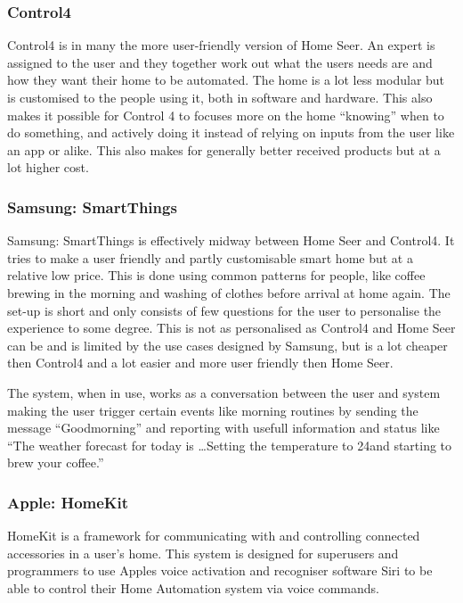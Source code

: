 \subsubsection{Control4}
Control4 is in many the more user-friendly version of Home Seer. An expert is assigned to the user and they together work out what the users needs are and how they want their home to be automated. The home is a lot less modular but is customised to the people using it, both in software and hardware. This also makes it possible for Control 4 to focuses more on the home \enquote{knowing} when to do something, and actively doing it instead of relying on inputs from the user like an app or alike. This also makes for generally better received products but at a lot higher cost.%

\subsubsection{Samsung: SmartThings}
Samsung: SmartThings is effectively midway between Home Seer and Control4. It tries to make a user friendly and partly customisable smart home but at a relative low price. This is done using common patterns for people, like coffee brewing in the morning and washing of clothes before arrival at home again. The set-up is short and only consists of few questions for the user to personalise the experience to some degree. This is not as personalised as Control4 and Home Seer can be and is limited by the use cases designed by Samsung, but is a lot cheaper then Control4 and a lot easier and more user friendly then Home Seer.

The system, when in use, works as a conversation between the user and system making the user trigger certain events like morning routines by sending the message \enquote{Goodmorning} and reporting with usefull information and status like \enquote{The weather forecast for today is \dots Setting the temperature to 24\degree  and starting to brew your coffee.}

\subsubsection{Apple: HomeKit}
HomeKit is a framework for communicating with and controlling connected accessories in a user's home. %
This system is designed for superusers and programmers to use Apples voice activation and recogniser software Siri to be able to control their Home Automation system via voice commands.